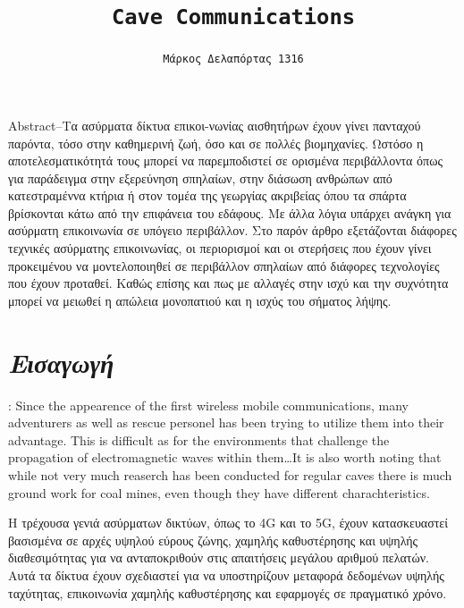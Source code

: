 \documentclass[12pt]{article}
\title{\texttt{Cave Communications}}
\author{\texttt{Μάρκος Δελαπόρτας 1316}}
\date{}
\begin{document}
\maketitle


\begin{multicols}{2}
    \scriptsize { %
        Abstract--Τα ασύρματα δίκτυα επικοι-νωνίας αισθητήρων έχουν γίνει
        πανταχού παρόντα, τόσο στην καθημερινή ζωή, όσο και σε πολλές βιομηχανίες. 
        Ωστόσο η αποτελεσματικότητά τους μπορεί να παρεμποδιστεί σε
        ορισμένα περιβάλλοντα όπως για παράδειγμα στην εξερεύνηση σπηλαίων, 
        στην διάσωση ανθρώπων από κατεστραμέννα κτήρια ή στον τομέα της γεωργίας ακριβείας 
        όπου τα σπάρτα βρίσκονται κάτω από την επιφάνεια του εδάφους. 
        Με άλλα λόγια υπάρχει ανάγκη για ασύρματη επικοινωνία σε υπόγειο περιβάλλον. 
        Στο παρόν άρθρο εξετάζονται διάφορες τεχνικές ασύρματης επικοινωνίας, 
        οι περιορισμοί και οι στερήσεις που έχουν γίνει προκειμένου να μοντελοποιηθεί σε περιβάλλον σπηλαίων από διάφορες τεχνολογίες που έχουν προταθεί. 
        Καθώς επίσης και πως με αλλαγές στην ισχύ και την συχνότητα μπορεί
        να μειωθεί η απώλεια
        μονοπατιού και η ισχύς του σήματος λήψης.
    }
    
    \section{\textit{\normalsize Εισαγωγή}}:
    Since the appearence of the first wireless mobile communications,
    many adventurers as well as rescue personel has been trying to utilize them into their advantage. This is difficult as for the environments that challenge the propagation of electromagnetic waves within them\dots It is also worth noting that while not very much reaserch has been conducted for regular caves there is much ground work for coal mines, even though they have different charachteristics.
    
    
    Η τρέχουσα γενιά ασύρματων δικτύων, όπως το 4G και το 5G, 
    έχουν κατασκευαστεί βασισμένα σε αρχές υψηλού εύρους ζώνης, 
    χαμηλής καθυστέρησης και υψηλής διαθεσιμότητας για να ανταποκριθούν
    στις απαιτήσεις μεγάλου αριθμού πελατών. 
    Αυτά τα δίκτυα έχουν σχεδιαστεί για να υποστηρίζουν μεταφορά δεδομένων υψηλής ταχύτητας, 
    επικοινωνία χαμηλής καθυστέρησης και εφαρμογές σε πραγματικό χρόνο.
    

\end{multicols}
\end{document}
